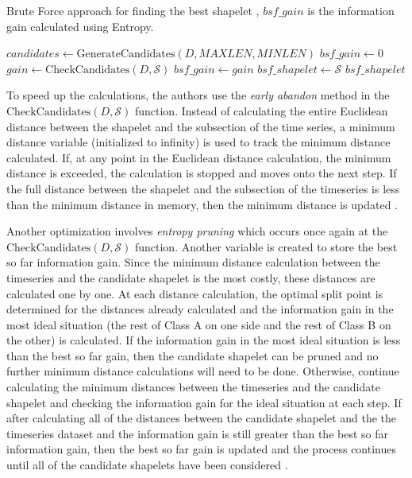 \begin{algorithm}
\caption{Brute Force approach for finding the best shapelet \cite{yeTimeSeriesShapelets2009}, $bsf\_gain$ is the information gain calculated using Entropy.}\label{alg:shapelet-brute}
\begin{algorithmic}
    \State $candidates \gets \text{GenerateCandidates}(D, MAXLEN, MINLEN)$
    \State $bsf\_gain \gets 0$
        \State $gain \gets \text{CheckCandidates}(D, \mathcal{S})$
            \State $bsf\_gain \gets gain$
            \State $bsf\_shapelet \gets \mathcal{S}$
        \EndIf
    \EndFor
    \State \Return $bsf\_shapelet$
\end{algorithmic}
\end{algorithm}

To speed up the calculations, the authors use the \textit{early abandon} method in the $\text{CheckCandidates}(D, \mathcal{S})$ function. Instead of calculating the entire Euclidean distance between the shapelet and the subsection of the time series, a minimum distance variable (initialized to infinity) is used to track the minimum distance calculated. If, at any point in the Euclidean distance calculation, the minimum distance is exceeded, the calculation is stopped and moves onto the next step. If the full distance between the shapelet and the subsection of the timeseries is less than the minimum distance in memory, then the minimum distance is updated \cite{yeTimeSeriesShapelets2009}.

Another optimization involves \textit{entropy pruning} which occurs once again at the $\text{CheckCandidates}(D, \mathcal{S})$ function. Another variable is created to store the best so far information gain. Since the minimum distance calculation between the timeseries and the candidate shapelet is the most costly, these distances are calculated one by one. At each distance calculation, the optimal split point is determined for the distances already calculated and the information gain in the most ideal situation (the rest of Class A on one side and the rest of Class B on the other) is calculated. If the information gain in the most ideal situation is less than the best so far gain, then the candidate shapelet can be pruned and no further minimum distance calculations will need to be done. Otherwise, continue calculating the minimum distances between the timeseries and the candidate shapelet and checking the information gain for the ideal situation at each step. If after calculating all of the distances between the candidate shapelet and the the timeseries dataset and the information gain is still greater than the best so far information gain, then the best so far gain is updated and the process continues until all of the candidate shapelets have been considered \cite{yeTimeSeriesShapelets2009}.

